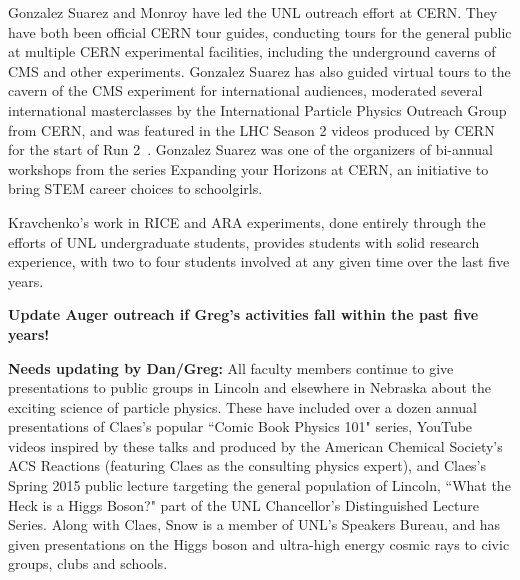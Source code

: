 Gonzalez Suarez and Monroy have led the UNL outreach effort at CERN. They have both been official CERN tour guides, conducting tours for the general public at multiple CERN experimental facilities, including the underground caverns of CMS and other experiments. Gonzalez Suarez has also guided virtual tours to the cavern of the CMS experiment for international audiences, moderated several international masterclasses by the International Particle Physics Outreach Group from CERN, and was featured in the LHC Season 2 videos produced by CERN for the start of Run 2~\cite{bib:LHCSeason2}. Gonzalez Suarez was one of the organizers of bi-annual workshops from the series Expanding your Horizons at CERN, an initiative to bring STEM career choices to schoolgirls. 

Kravchenko's work in RICE and ARA experiments, done entirely through the efforts of UNL undergraduate students, provides students with solid research experience, with two to four students involved at any given time over the last five years.  

{\bf Update Auger outreach if Greg's activities fall within the past five years!}

{\bf Needs updating by Dan/Greg:}
All faculty members continue to give presentations to public groups in Lincoln and elsewhere in Nebraska about the exciting science of particle physics. These have included over a dozen annual presentations of Claes's popular ``Comic Book Physics 101" series, YouTube videos inspired by these talks and produced by the American Chemical Society's ACS Reactions (featuring Claes as the consulting physics expert), and Claes's Spring 2015 public lecture targeting the general population of Lincoln, ``What the Heck is a Higgs Boson?" part of the UNL Chancellor's Distinguished Lecture Series.  Along with Claes, Snow is a member of UNL's Speakers Bureau, and has given presentations on the Higgs boson and ultra-high energy cosmic rays to civic groups, clubs and schools.

